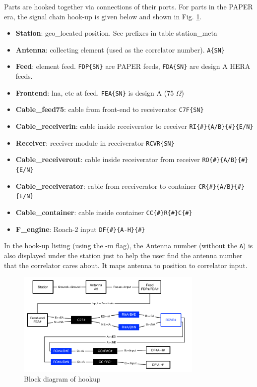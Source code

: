 \documentclass{article}
\begin{document}
Parts are hooked together via connections of their ports.   For parts in the PAPER era, the signal chain hook-up is given below and shown in Fig. \ref{fig:hookup}.
\begin{itemize}
\setlength\itemsep{-.3em}
	\item {\bf Station}: geo\_located position.  See prefixes in table station\_meta
	\item {\bf Antenna}:  collecting element (used as the correlator number).  {\tt A\{SN\}}
	\item {\bf Feed}:  element feed.  {\tt FDP\{SN\}} are PAPER feeds, {\tt FDA\{SN\}} are design A HERA feeds.
	\item {\bf Frontend}:  lna, etc at feed.  {\tt FEA\{SN\}} is design A (75 $\Omega$)
	\item {\bf Cable\_feed75}:  cable from front-end to receiverator {\tt C7F\{SN\}}
	\item {\bf Cable\_receiverin}:  cable inside receiverator to receiver {\tt RI\{\#\}\{A/B\}\{\#\}\{E/N\}}
	\item {\bf Receiver}:  receiver module in receiverator {\tt RCVR\{SN\}}
	\item {\bf Cable\_receiverout}:  cable inside receiverator from receiver {\tt RO\{\#\}\{A/B\}\{\#\}\{E/N\}}
	\item {\bf Cable\_receiverator}:  cable from receiverator to container {\tt CR\{\#\}\{A/B\}\{\#\}\{E/N\}}
	\item {\bf Cable\_container}:  cable inside container {\tt CC\{\#\}R\{\#\}C\{\#\}}
	\item {\bf F\_engine}:  Roach-2 input {\tt DF\{\#\}\{A-H\}\{\#\}}
\end{itemize}

In the hook-up listing (using the -m flag), the Antenna number (without the {\tt A}) is also displayed under the station just to help the user find the antenna number that the correlator cares about.  It maps antenna to position to correlator input.

\begin{figure}[H]
\includegraphics[width=0.8\textwidth]{hookup.pdf}
\centering
\caption{Block diagram of hookup}
\label{fig:hookup}
\end{figure}
\end{document}

